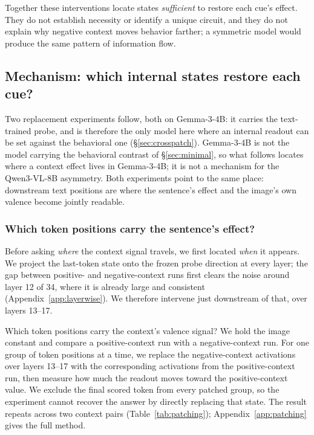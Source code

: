 \documentclass{article}
\newcommand{\gemma}{Gemma-3-4B}
\newcommand{\qwen}{Qwen3-VL-8B}
\begin{document}
Together these interventions locate states \emph{sufficient} to restore each cue's effect. They do not establish necessity or identify a unique circuit, and they do not explain why negative context moves behavior farther; a symmetric model would produce the same pattern of information flow.
\else
\subsection{Mechanism: which internal states restore each cue?}
\label{sec:mechanism}

Two replacement experiments follow, both on \gemma{}: it carries the text-trained probe, and is therefore the only model here where an internal readout can be set against the behavioral one (\S\ref{sec:crosspatch}). \gemma{} is not the model carrying the behavioral contrast of \S\ref{sec:minimal}, so what follows locates where a context effect lives in \gemma{}; it is not a mechanism for the \qwen{} asymmetry. Both experiments point to the same place: downstream text positions are where the sentence's effect and the image's own valence become jointly readable.

\subsubsection{Which token positions carry the sentence's effect?}
\label{sec:patching}

Before asking \emph{where} the context signal travels, we first located \emph{when} it appears. We project the last-token state onto the frozen probe direction at every layer; the gap between positive- and negative-context runs first clears the noise around layer 12 of 34, where it is already large and consistent (Appendix~\ref{app:layerwise}). We therefore intervene just downstream of that, over layers 13--17.

Which token positions carry the context's valence signal? We hold the image constant and compare a positive-context run with a negative-context run. For one group of token positions at a time, we replace the negative-context activations over layers 13--17 with the corresponding activations from the positive-context run, then measure how much the readout moves toward the positive-context value. We exclude the final scored token from every patched group, so the experiment cannot recover the answer by directly replacing that state. The result repeats across two context pairs (Table~\ref{tab:patching}); Appendix~\ref{app:patching} gives the full method.
\end{document}
